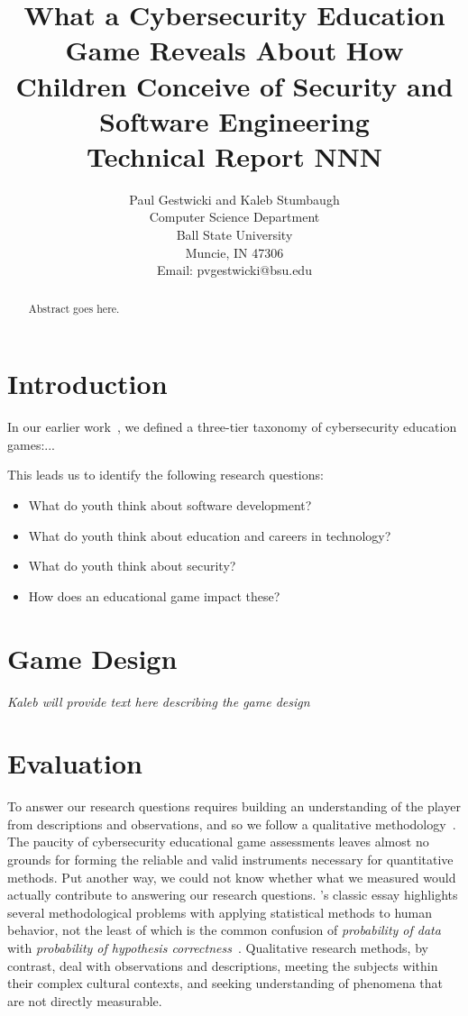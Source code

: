 \documentclass[letterpaper]{article}
\title{What a Cybersecurity Education Game Reveals About How Children Conceive of Security and Software Engineering\\
\medskip
\serc{} Technical Report \textbf{NNN}\\
}
\author{Paul Gestwicki and Kaleb Stumbaugh\\
Computer Science Department\\
Ball State University\\
Muncie, IN 47306\\
Email: pvgestwicki@bsu.edu}
\begin{document}
\maketitle


\begin{abstract}
  Abstract goes here.
\end{abstract}

\section{Introduction}

In our earlier work~\citep{Gestwicki2015,Gestwicki2015-tr},
we defined a three-tier taxonomy of cybersecurity education games:...

This leads us to identify the following research questions:
\begin{itemize}
\item What do youth think about software development?
\item What do youth think about education and careers in technology?
\item What do youth think about security?
\item How does an educational game impact these?
\end{itemize}


\section{Game Design}

\textit{Kaleb will provide text here describing the game design}

\section{Evaluation}

To answer our research questions requires building an understanding of
the player from descriptions and observations, and so we follow a
qualitative methodology~\citep[see][for example]{Stake2010}.  The
paucity of cybersecurity educational game assessments leaves almost no
grounds for forming the reliable and valid instruments necessary for
quantitative methods. Put another way, we could not know whether what
we measured would actually contribute to answering our research
questions.  \citeauthor{Cohen1994}'s classic essay highlights several
methodological problems with applying statistical methods to human
behavior, not the least of which is the common confusion of
\textit{probability of data} with \textit{probability of hypothesis
  correctness}~\citep{Cohen1994}.
Qualitative research methods, by contrast, deal with 
observations and descriptions, meeting the subjects within their
complex cultural contexts, and seeking understanding of phenomena
that are not directly measurable. 
\end{document}
